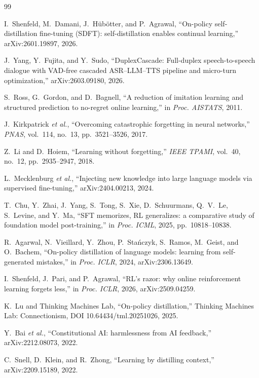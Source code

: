 \documentclass[conference]{IEEEtran}
\begin{document}
\begin{thebibliography}{99}

I.~Shenfeld, M.~Damani, J.~H{\"u}b{\"o}tter, and P.~Agrawal,
``On-policy self-distillation fine-tuning (SDFT): self-distillation enables continual
learning,'' arXiv:2601.19897, 2026.

J.~Yang, Y.~Fujita, and Y.~Sudo,
``DuplexCascade: Full-duplex speech-to-speech dialogue with VAD-free cascaded
ASR--LLM--TTS pipeline and micro-turn optimization,'' arXiv:2603.09180, 2026.

S.~Ross, G.~Gordon, and D.~Bagnell,
``A reduction of imitation learning and structured prediction to no-regret online
learning,'' in \emph{Proc. AISTATS}, 2011.

J.~Kirkpatrick \emph{et al.},
``Overcoming catastrophic forgetting in neural networks,'' \emph{PNAS},
vol.~114, no.~13, pp.~3521--3526, 2017.

Z.~Li and D.~Hoiem,
``Learning without forgetting,'' \emph{IEEE TPAMI}, vol.~40, no.~12,
pp.~2935--2947, 2018.

L.~Mecklenburg \emph{et al.},
``Injecting new knowledge into large language models via supervised fine-tuning,''
arXiv:2404.00213, 2024.

T.~Chu, Y.~Zhai, J.~Yang, S.~Tong, S.~Xie, D.~Schuurmans, Q.~V.~Le, S.~Levine, and
Y.~Ma,
``SFT memorizes, RL generalizes: a comparative study of foundation model
post-training,'' in \emph{Proc. ICML}, 2025, pp.~10818--10838.

R.~Agarwal, N.~Vieillard, Y.~Zhou, P.~Sta{\'n}czyk, S.~Ramos, M.~Geist, and O.~Bachem,
``On-policy distillation of language models: learning from self-generated mistakes,''
in \emph{Proc. ICLR}, 2024, arXiv:2306.13649.

I.~Shenfeld, J.~Pari, and P.~Agrawal,
``RL's razor: why online reinforcement learning forgets less,''
in \emph{Proc. ICLR}, 2026, arXiv:2509.04259.

K.~Lu and Thinking Machines Lab,
``On-policy distillation,'' Thinking Machines Lab: Connectionism,
DOI 10.64434/tml.20251026, 2025.

Y.~Bai \emph{et al.},
``Constitutional AI: harmlessness from AI feedback,'' arXiv:2212.08073, 2022.

C.~Snell, D.~Klein, and R.~Zhong,
``Learning by distilling context,'' arXiv:2209.15189, 2022.


\end{thebibliography}
\end{document}
